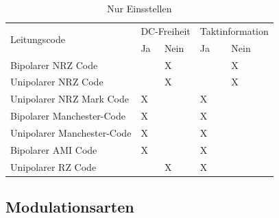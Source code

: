 \begin{table}[h!]
\centering
\begin{tabular}{|l|l|l|l|l|}
\hline
\multirow{2}{*}{Leitungscode} & \multicolumn{2}{l|}{DC-Freiheit} & \multicolumn{2}{l|}{Taktinformation} \\ \cline{2-5} 
                              & Ja             & Nein            & Ja               & Nein              \\ \hline
Bipolarer NRZ Code            &                & X               &                  & X                 \\ \hline
Unipolarer NRZ Code           &                & X               &                  & X                 \\ \hline
Unipolarer NRZ Mark Code      & X              &                 & X                &                   \\ \hline
Bipolarer Manchester-Code     & X              &                 & X                &                   \\ \hline
Unipolarer Manchester-Code    & X              &                 & X                &                   \\ \hline
Bipolarer AMI Code            & X              &                 & X                &                   \\ \hline
Unipolarer RZ Code			 &				  & X		       & X				&					\\ \hline
\end{tabular}
\caption{Nur Einsstellen}
\end{table}

\clearpage
\subsection{Modulationsarten}
